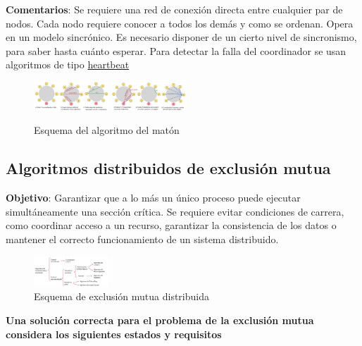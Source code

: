 \textbf{Comentarios}: Se requiere una red de conexión directa entre cualquier par de nodos. Cada nodo requiere conocer a todos los demás y como se ordenan. Opera en un modelo sincrónico. Es necesario disponer de un cierto nivel de sincronismo, para saber hasta cuánto esperar. Para detectar la falla del coordinador se usan algoritmos de tipo \underline{heartbeat}

\begin{figure}[H]
    \centering
    \includegraphics[width=0.25\textwidth]{img/Bully_1.png}
    \includegraphics[width=0.25\textwidth]{img/Bully_2.png}
    \caption{Esquema del algoritmo del matón}
    
\end{figure}

\subsection{Algoritmos distribuidos de exclusión mutua}

\textbf{Objetivo}: Garantizar que a lo más un único proceso puede ejecutar simultáneamente una sección crítica. Se requiere evitar condiciones de carrera, como coordinar acceso a un recurso, garantizar la consistencia de los datos o mantener el correcto funcionamiento de un sistema distribuido.

\begin{figure}[H]
    \centering
    \includegraphics[width=0.25\textwidth]{img/Clasificacion_algoritmos.png}
    \caption{Esquema de exclusión mutua distribuida}
\end{figure}

\textbf{Una solución correcta para el problema de la exclusión mutua considera los siguientes estados y requisitos}

